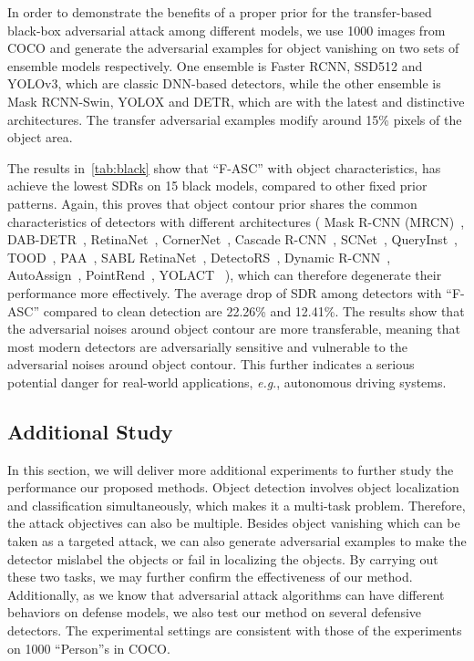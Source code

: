 \documentclass[times,twocolumn,final,authoryear]{elsarticle}
\def\onedot{.\null\xspace}
\def\eg{\emph{e.g}\onedot} \def\Eg{\emph{E.g}\onedot}
\begin{document}
In order to demonstrate the benefits of a proper prior for the transfer-based black-box adversarial attack among different models, we use 1000 images from COCO and generate the adversarial examples for object vanishing on two sets of ensemble models respectively. One ensemble is Faster RCNN, SSD512 and YOLOv3, which are classic DNN-based detectors, while the other ensemble is Mask RCNN-Swin, YOLOX and DETR, which are with the latest and distinctive architectures. The transfer adversarial examples modify around 15\% pixels of the object area. 


The results in~\cref{tab:black} show that ``F-ASC'' with object characteristics, has achieve the lowest SDRs on 15 black models, compared to other fixed prior patterns. Again, this proves that object contour prior shares the common characteristics of detectors with different architectures (
Mask R-CNN (MRCN)~\citep{he2017mask}, 
DAB-DETR~\citep{liu2022dabdetr}, 
RetinaNet~\citep{lin2017focal}, 
CornerNet~\citep{law2018cornernet}, 
Cascade R-CNN~\citep{cai2018cascade}, 
SCNet~\citep{liu2020scnet}, 
QueryInst~\citep{Fang_2021_ICCV},
TOOD~\citep{feng2021tood},
PAA~\citep{paa-eccv2020},
SABL RetinaNet~\citep{Wang_2020_ECCV},
DetectoRS~\citep{qiao2020detectors},
Dynamic R-CNN~\citep{DynamicRCNN},
AutoAssign~\citep{zhu2020autoassign},
PointRend~\citep{kirillov2019pointrend},
YOLACT~\citep{yolact-iccv2019}
), which can therefore degenerate their performance more effectively. The average drop of SDR among detectors with ``F-ASC'' compared to clean detection are 22.26\% and 12.41\%. The results show that the adversarial noises around object contour are more transferable, meaning that most modern detectors are adversarially sensitive and vulnerable to the adversarial noises around object contour. This further indicates a serious potential danger for real-world applications, \eg, autonomous driving systems. 






\subsection{Additional Study}

In this section, we will deliver more additional experiments to further study the performance our proposed methods. Object detection involves object localization and classification simultaneously, which makes it a multi-task problem. Therefore, the attack objectives can also be multiple. Besides object vanishing which can be taken as a targeted attack, we can also generate adversarial examples to make the detector mislabel the objects or fail in localizing the objects. By carrying out these two tasks, we may further confirm the effectiveness of our method. Additionally, as we know that adversarial attack algorithms can have different behaviors on defense models, we also test our method on several defensive detectors. The experimental settings are consistent with those of the experiments on 1000 ``Person''s in COCO.
\end{document}
